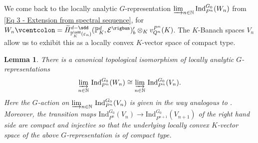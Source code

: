 \documentclass[a4paper, reqno, 10pt]{amsart}
\newtheorem{lemma}[theorem]{Lemma}
\theoremstyle{definition}
\numberwithin{equation}{section}
\newcommand{\defeq}{\vcentcolon=}
\newcommand{\Ind}{{\mathrm{Ind}}}
\newcommand{\ra}{\rightarrow}
\newcommand{\BN}{{\mathbb {N}}}
\newcommand{\BP}{{\mathbb {P}}}
\newcommand{\CE}{{\mathcal {E}}}
\begin{document}
We come back to the locally analytic $G$-representation $\varinjlim_{n \in \BN} \Ind_{P^n}^{G_0} (W_n)$ from \eqref{Eq 3 - Extension from spectral sequence}, for $W_n \defeq \widetilde{H}^{d-\sdd}_{\BP_K^\sdd(\varepsilon_n)} (\BP_K^d, \CE^\rigbun)'_b \otimes_K v^{P^n}_{Q^n}(K)$.
The $K$-Banach spaces $V_n$ allow us to exhibit this as a locally convex $K$-vector space of compact type.



\begin{lemma}\label{Lemma 3 - Limit of inductions is of compact type}
	There is a canonical topological isomorphism of locally analytic $G$-re\-pre\-sen\-ta\-tions
	\begin{equation}\label{Eq 3 - Limit of inductions isomorphic to limit over Banach spaces}
		\varinjlim_{n\in \BN}\, \Ind^{G_0}_{P^n}  (W_n) \cong \varinjlim_{n\in \BN}\, \Ind^{G_0}_{P^n}  (V_n).
	\end{equation}
	Here the $G$-action on $\varinjlim_{n\in \BN}\, \Ind^{G_0}_{P^n}  (V_n)$ is given in the way analogous to .
	Moreover, the transition maps $\Ind^{G_0}_{P^n} (V_n) \ra \Ind^{G_0}_{P^{n+1}} (V_{n+1})$ of the right hand side are compact and injective so that the underlying locally convex $K$-vector space of the above $G$-representation is of compact type.
\end{lemma}
\end{document}
